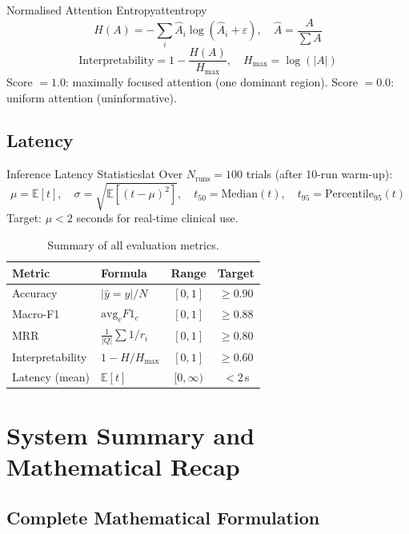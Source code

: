 \documentclass[12pt,a4paper]{article}
\begin{document}
\begin{definition}{Normalised Attention Entropy}{attentropy}
\[
  H(A) = -\sum_i \hat{A}_i \log(\hat{A}_i + \varepsilon),\quad
  \hat{A} = \frac{A}{\sum A}
\]
\[
  \text{Interpretability} = 1 - \frac{H(A)}{H_{\max}},\quad
  H_{\max} = \log(|A|)
\]
Score $= 1.0$: maximally focused attention (one dominant region).
Score $= 0.0$: uniform attention (uninformative).
\end{definition}

\subsection{Latency}

\begin{definition}{Inference Latency Statistics}{lat}
Over $N_\text{runs}=100$ trials (after 10-run warm-up):
\[
  \mu = \mathbb{E}[t],\quad
  \sigma = \sqrt{\mathbb{E}[(t-\mu)^2]},\quad
  t_{50} = \text{Median}(t),\quad
  t_{95} = \text{Percentile}_{95}(t)
\]
Target: $\mu < 2$ seconds for real-time clinical use.
\end{definition}

\begin{table}[H]
\centering
\caption{Summary of all evaluation metrics.}
\begin{tabular}{llcc}
\toprule
\textbf{Metric} & \textbf{Formula} & \textbf{Range} & \textbf{Target} \\
\midrule
Accuracy     & $|\hat{y}=y|/N$         & $[0,1]$     & $\geq 0.90$ \\
Macro-F1     & $\text{avg}_c F1_c$      & $[0,1]$     & $\geq 0.88$ \\
MRR          & $\frac{1}{|Q|}\sum 1/r_i$& $[0,1]$     & $\geq 0.80$ \\
Interpretability& $1-H/H_\text{max}$   & $[0,1]$     & $\geq 0.60$ \\
Latency (mean)& $\mathbb{E}[t]$         & $[0,\infty)$& $<2$\,s \\
\bottomrule
\end{tabular}
\end{table}

\section{System Summary and Mathematical Recap}

\subsection{Complete Mathematical Formulation}
\end{document}
